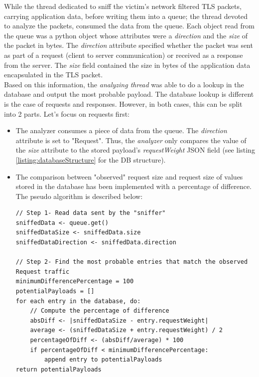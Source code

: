\documentclass[journal]{IEEEtran}
\begin{document}
While the thread dedicated to sniff the victim's network filtered TLS packets, carrying application data, before writing them into a queue; the thread devoted to analyze the packets, consumed the data from the queue. Each object read from the queue was a python object whose attributes were a \emph{direction} and the \emph{size} of the packet in bytes. The \emph{direction} attribute specified whether the packet was sent as part of a request (client to server communication) or received as a response from the server. The \emph{size} field contained the size in bytes of the application data encapsulated in the TLS packet. \\
Based on this information, the \emph{analyzing thread} was able to do a lookup in the database and output the most probable payload. The database lookup is different is the case of requests and responses. However, in both cases, this can be split into 2 parts. Let's focus on requests first:

\begin{itemize}
\item The analyzer consumes a piece of data from the queue. The \emph{direction} attribute is set to "Request". Thus, the \emph{analyzer} only compares the value of the \emph{size} attribute to the stored payload's \emph{requestWeight} JSON field (see listing \ref{listing:databaseStructure} for the DB structure).
\item The comparison between "observed" request size and request size of values stored in the database has been implemented with a percentage of difference. The pseudo algorithm is described below:
\begin{lstlisting}[caption=Pseudo algorithm to infer user input during a Request, label={listing:inferenceRequest}]
// Step 1- Read data sent by the "sniffer"
sniffedData <- queue.get()
sniffedDataSize <- sniffedData.size
sniffedDataDirection <- sniffedData.direction

// Step 2- Find the most probable entries that match the observed Request traffic
minimumDifferencePercentage = 100
potentialPayloads = []
for each entry in the database, do:
	// Compute the percentage of difference
    absDiff <- |sniffedDataSize - entry.requestWeight|
    average <- (sniffedDataSize + entry.requestWeight) / 2
    percentageOfDiff <- (absDiff/average) * 100
    if percentageOfDiff < minimumDifferencePercentage:
    	append entry to potentialPayloads
return potentialPayloads
\end{lstlisting}
\end{itemize}
\end{document}
